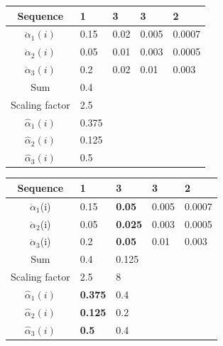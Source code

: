\begin{frame}
\begin{table}[h]
\begin{tabular}{|c|l|l|l|l|}
 \hline
Sequence      & 1     & 3    & 3     & 2      \\ \hline
$\ddot{\alpha}_1(i)$          & 0.15  & 0.02 & 0.005 & 0.0007 \\ \hline
$\ddot{\alpha}_2(i)$          & 0.05  & 0.01 & 0.003 & 0.0005 \\ \hline
$\ddot{\alpha}_3(i)$          & 0.2   & 0.02 & 0.01  & 0.003  \\ \hline
Sum            & 0.4   &      &       &        \\ \hline
Scaling factor & 2.5   &      &       &        \\ \hline
$\hat{\alpha}_1(i)$          & 0.375 &      &       &        \\ \hline
$\hat{\alpha}_2(i)$          & 0.125 &      &       &        \\ \hline
$\hat{\alpha}_3(i)$          & 0.5   &      &       &        \\ \hline
\end{tabular}
\end{table}
\end{frame}

\begin{frame}
\begin{table}[h]
\begin{tabular}{|c|l|l|l|l|}
 \hline
Sequence      & 1              & 3              & 3     & 2      \\ \hline
$\ddot{\alpha}_1$(i)          & 0.15           & \textbf{0.05}  & 0.005 & 0.0007 \\ \hline
$\ddot{\alpha}_2$(i)          & 0.05           & \textbf{0.025} & 0.003 & 0.0005 \\ \hline
$\ddot{\alpha}_3$(i)          & 0.2            & \textbf{0.05}  & 0.01  & 0.003  \\ \hline
Sum            & 0.4            & 0.125          &       &        \\ \hline
Scaling factor & 2.5            & 8              &       &        \\ \hline
$\hat{\alpha}_1(i)$          & \textbf{0.375} & 0.4            &       &        \\ \hline
$\hat{\alpha}_2(i)$          & \textbf{0.125} & 0.2            &       &        \\ \hline
$\hat{\alpha}_3(i)$          & \textbf{0.5}   & 0.4            &       &        \\ \hline
\end{tabular}
\end{table}
\end{frame}

